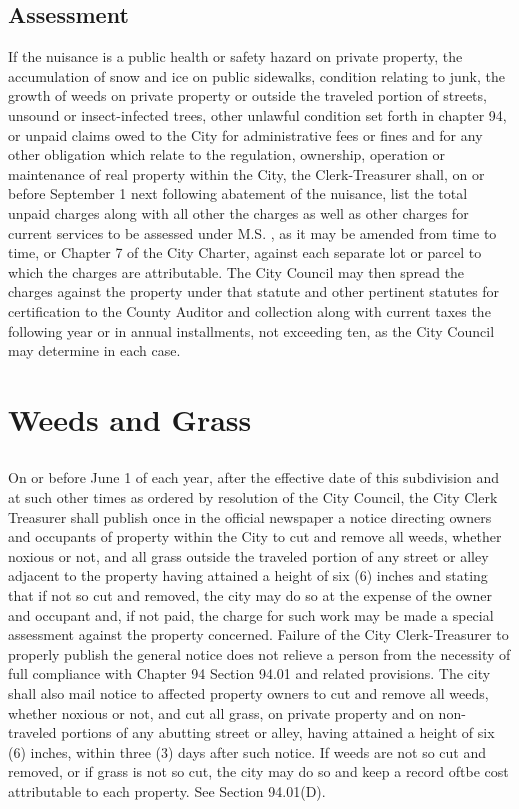 \subsection{Assessment}
If the nuisance is a public health or safety hazard on private property, the accumulation of snow and ice on public sidewalks, condition relating to junk, the growth of weeds on private property or outside the traveled portion of streets, unsound or insect-infected trees, other unlawful condition set forth in chapter 94, or unpaid claims owed to the City for administrative fees or fines and for any other obligation which relate to the regulation, ownership, operation or maintenance of real property within the City, the Clerk-Treasurer shall, on or before September 1 next following abatement of the nuisance, list the total unpaid charges along with all other the charges as well as other charges for current services to be assessed under M.S. , as it may be amended from time to time, or Chapter 7 of the City Charter, against each separate lot or parcel to which the charges are attributable.  The City Council may then spread the charges against the property under that statute and other pertinent statutes for certification to the County Auditor and collection along with current taxes the following year or in annual installments, not exceeding ten, as the City Council may determine in each case.\\


\setcounter{section}{34}
\section{Weeds and Grass}
\subsection{}
On or before June 1 of each year, after the effective date of this subdivision and at such other times as ordered by resolution of the City Council, the City Clerk Treasurer shall publish once in the official newspaper a notice directing owners and occupants of property within the City to cut and remove all weeds, whether noxious or not, and all grass outside the traveled portion of any street or alley adjacent to the property having attained a height of six (6) inches and stating that if not so cut and removed, the city may do so at the expense of the owner and occupant and, if not paid, the charge for such work may be made a special assessment against the property concerned. Failure of the City Clerk-Treasurer to properly publish the general notice does not relieve a person from the necessity of full compliance with Chapter 94 Section 94.01 and related provisions. The city shall also mail notice to affected property owners to cut and remove all weeds, whether noxious or not, and cut all grass, on private property and on non-traveled portions of any abutting street or alley, having attained a height of six (6) inches, within three (3) days after such notice. If weeds are not so cut and removed, or if grass is not so cut, the city may do so and keep a record oftbe cost attributable to each property. See Section 94.01(D).
